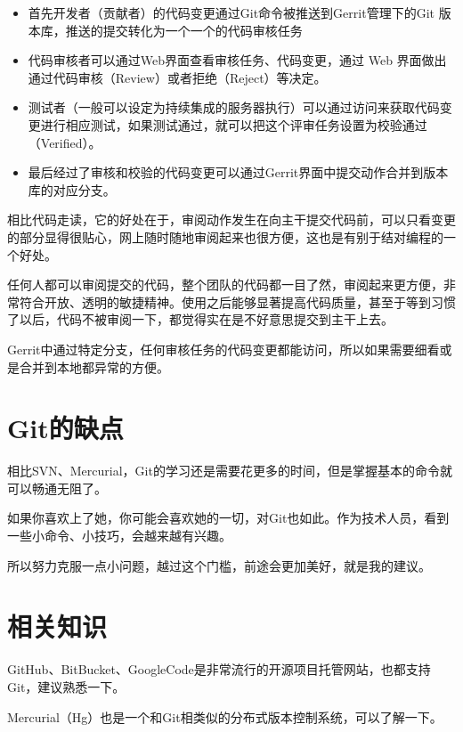 \begin{itemize}
\item 首先开发者（贡献者）的代码变更通过Git命令被推送到Gerrit管理下的Git 版本库，推送的提交转化为一个一个的代码审核任务

\item 代码审核者可以通过Web界面查看审核任务、代码变更，通过 Web 界面做出通过代码审核（Review）或者拒绝（Reject）等决定。

\item 测试者（一般可以设定为持续集成的服务器执行）可以通过访问来获取代码变更进行相应测试，如果测试通过，就可以把这个评审任务设置为校验通过（Verified）。

\item 最后经过了审核和校验的代码变更可以通过Gerrit界面中提交动作合并到版本库的对应分支。

\end{itemize}

相比代码走读，它的好处在于，审阅动作发生在向主干提交代码前，可以只看变更的部分显得很贴心，网上随时随地审阅起来也很方便，这也是有别于结对编程的一个好处。

任何人都可以审阅提交的代码，整个团队的代码都一目了然，审阅起来更方便，非常符合开放、透明的敏捷精神。使用之后能够显著提高代码质量，甚至于等到习惯了以后，代码不被审阅一下，都觉得实在是不好意思提交到主干上去。

Gerrit中通过特定分支，任何审核任务的代码变更都能访问，所以如果需要细看或是合并到本地都异常的方便。

\section{Git的缺点}
\label{git的缺点}

相比SVN、Mercurial，Git的学习还是需要花更多的时间，但是掌握基本的命令就可以畅通无阻了。

如果你喜欢上了她，你可能会喜欢她的一切，对Git也如此。作为技术人员，看到一些小命令、小技巧，会越来越有兴趣。

所以努力克服一点小问题，越过这个门槛，前途会更加美好，就是我的建议。

\section{相关知识}
\label{相关知识}

GitHub、BitBucket、GoogleCode是非常流行的开源项目托管网站，也都支持Git，建议熟悉一下。

Mercurial（Hg）也是一个和Git相类似的分布式版本控制系统，可以了解一下。

